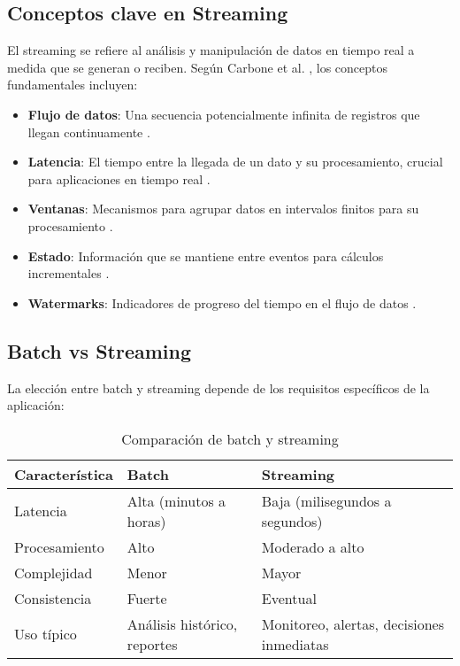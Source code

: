 \subsection{Conceptos clave en Streaming}

El streaming se refiere al análisis y manipulación de datos en tiempo real a medida que se generan o reciben. Según Carbone et al. \parencite{carbone2015apache}, los conceptos fundamentales incluyen:

\begin{itemize}
    \item \textbf{Flujo de datos}: Una secuencia potencialmente infinita de registros que llegan continuamente \parencite{akidau2015dataflow}.
    \item \textbf{Latencia}: El tiempo entre la llegada de un dato y su procesamiento, crucial para aplicaciones en tiempo real \parencite{akidau2015dataflow}.
    \item \textbf{Ventanas}: Mecanismos para agrupar datos en intervalos finitos para su procesamiento \parencite{akidau2015dataflow}.
    \item \textbf{Estado}: Información que se mantiene entre eventos para cálculos incrementales \parencite{carbone2015apache}.
    \item \textbf{Watermarks}: Indicadores de progreso del tiempo en el flujo de datos \parencite{akidau2015dataflow}.
\end{itemize}
\newpage
\subsection{Batch vs Streaming}

La elección entre batch y streaming depende de los requisitos específicos de la aplicación:

\begin{table}[h]
\centering
\begin{tabular}{|p{3cm}|p{5cm}|p{5cm}|}
\hline
\textbf{Característica} & \textbf{Batch} & \textbf{Streaming} \\
\hline
Latencia & Alta (minutos a horas) & Baja (milisegundos a segundos) \\
\hline
Procesamiento & Alto & Moderado a alto \\
\hline
Complejidad & Menor & Mayor \\
\hline
Consistencia & Fuerte & Eventual \\
\hline
Uso típico & Análisis histórico, reportes & Monitoreo, alertas, decisiones inmediatas \\
\hline
\end{tabular}
\caption{Comparación de batch y streaming}
\label{tab:batch_vs_streaming}
\end{table}

